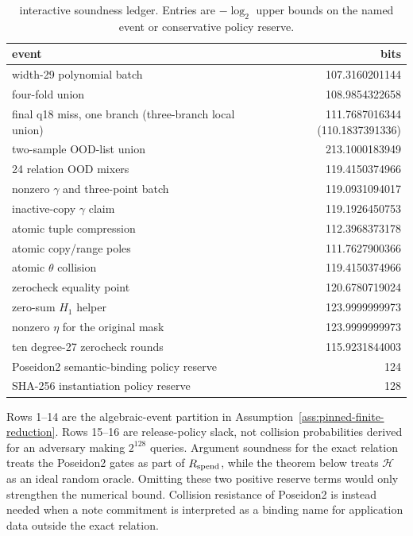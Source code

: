 \begin{table}[t]
\centering
\small
\caption{\Profile{} interactive soundness ledger.  Entries are
\(-\log_2\) upper bounds on the named event or conservative policy reserve.}
\label{tab:soundness-events}
\begin{tabular}{@{}lr@{}}
\toprule
event & bits \\
\midrule
width-29 polynomial batch & 107.3160201144 \\
four-fold union & 108.9854322658 \\
final q18 miss, one branch (three-branch local union) & 111.7687016344 (110.1837391336) \\
two-sample OOD-list union & 213.1000183949 \\
24 relation OOD mixers & 119.4150374966 \\
nonzero \(\gamma\) and three-point batch & 119.0931094017 \\
inactive-copy \(\gamma\) claim & 119.1926450753 \\
atomic tuple compression & 112.3968373178 \\
atomic copy/range poles & 111.7627900366 \\
atomic \(\theta\) collision & 119.4150374966 \\
zerocheck equality point & 120.6780719024 \\
zero-sum \(H_1\) helper & 123.9999999973 \\
nonzero \(\eta\) for the original mask & 123.9999999973 \\
ten degree-27 zerocheck rounds & 115.9231844003 \\
Poseidon2 semantic-binding policy reserve & 124 \\
SHA-256 instantiation policy reserve & 128 \\
\bottomrule
\end{tabular}
\end{table}

Rows 1--14 are the algebraic-event partition in
Assumption~\ref{ass:pinned-finite-reduction}.  Rows 15--16 are release-policy
slack, not collision probabilities derived for an adversary making
\(2^{128}\) queries.  Argument soundness for the exact relation treats the
Poseidon2 gates as part of \(R_{\mathrm{spend}}\), while the theorem below treats
\(\mathcal H\) as an ideal random oracle.  Omitting these two positive reserve
terms would only strengthen the numerical bound.  Collision resistance of
Poseidon2 is instead needed when a note commitment is interpreted as a
binding name for application data outside the exact relation.

